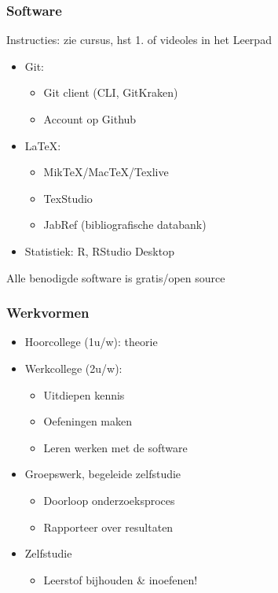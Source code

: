 \documentclass[aspectratio=169]{beamer}
\begin{document}
\begin{frame}
  \frametitle{Software}
  
  Instructies: zie cursus, hst 1. of videoles in het Leerpad
  
  \begin{itemize}
    \item Git:
    \begin{itemize}
      \item Git client (CLI, GitKraken)
      \item Account op Github
    \end{itemize}
    \item {\LaTeX}:
    \begin{itemize}
      \item MikTeX/MacTeX/Texlive
      \item TexStudio
      \item JabRef (bibliografische databank)
    \end{itemize}
    \item Statistiek: R, RStudio Desktop
  \end{itemize}
  
  \centering
  Alle benodigde software is gratis/open source
\end{frame}

\begin{frame}
  \frametitle{Werkvormen}
  
  \begin{itemize}
    \item Hoorcollege (1u/w): theorie
    \item Werkcollege (2u/w):
    \begin{itemize}
      \item Uitdiepen kennis
      \item Oefeningen maken
      \item Leren werken met de software
    \end{itemize}
    \item Groepswerk, begeleide zelfstudie
    \begin{itemize}
      \item Doorloop onderzoeksproces
      \item Rapporteer over resultaten
    \end{itemize}
    \item Zelfstudie
    \begin{itemize}
      \item Leerstof bijhouden \& inoefenen!
    \end{itemize}
  \end{itemize}
\end{frame}
\end{document}

